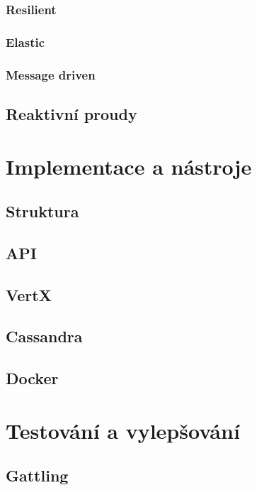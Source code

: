 \documentclass[FM,DP]{tulthesis}
\begin{document}
\subsection{Resilient}

\subsection{Elastic}

\subsection{Message driven}

\section{Reaktivní proudy}

\chapter{Implementace a nástroje}

\section{Struktura}

\section{API}

\section{VertX}

\section{Cassandra}

\section{Docker}

\chapter{Testování a vylepšování}

\section{Gattling}
\end{document}
